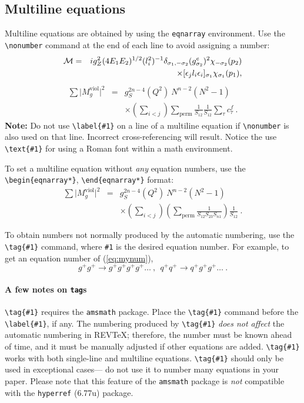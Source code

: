 \documentclass[%
 preprint, linenumbers,
 amsmath,amssymb,
 aps, physrev,
]{revtex4-2}
\begin{document}
\subsection{Multiline equations}

Multiline equations are obtained by using the \verb+eqnarray+
environment.  Use the \verb+\nonumber+ command at the end of each line
to avoid assigning a number:
\begin{eqnarray}
{\cal M}=&&ig_Z^2(4E_1E_2)^{1/2}(l_i^2)^{-1}
\delta_{\sigma_1,-\sigma_2}
(g_{\sigma_2}^e)^2\chi_{-\sigma_2}(p_2)\nonumber\\
&&\times
[\epsilon_jl_i\epsilon_i]_{\sigma_1}\chi_{\sigma_1}(p_1),
\end{eqnarray}
\begin{eqnarray}
\sum \vert M^{\text{viol}}_g \vert ^2&=&g^{2n-4}_S(Q^2)~N^{n-2}
        (N^2-1)\nonumber \\
 & &\times \left( \sum_{i<j}\right)
  \sum_{\text{perm}}
 \frac{1}{S_{12}}
 \frac{1}{S_{12}}
 \sum_\tau c^f_\tau~.
\end{eqnarray}
\textbf{Note:} Do not use \verb+\label{#1}+ on a line of a multiline
equation if \verb+\nonumber+ is also used on that line. Incorrect
cross-referencing will result. Notice the use \verb+\text{#1}+ for
using a Roman font within a math environment.

To set a multiline equation without \emph{any} equation
numbers, use the \verb+\begin{eqnarray*}+,
\verb+\end{eqnarray*}+ format:
\begin{eqnarray*}
\sum \vert M^{\text{viol}}_g \vert ^2&=&g^{2n-4}_S(Q^2)~N^{n-2}
        (N^2-1)\\
 & &\times \left( \sum_{i<j}\right)
 \left(
  \sum_{\text{perm}}\frac{1}{S_{12}S_{23}S_{n1}}
 \right)
 \frac{1}{S_{12}}~.
\end{eqnarray*}

To obtain numbers not normally produced by the automatic numbering,
use the \verb+\tag{#1}+ command, where \verb+#1+ is the desired
equation number. For example, to get an equation number of
(\ref{eq:mynum}),
\begin{equation}
g^+g^+ \rightarrow g^+g^+g^+g^+ \dots ~,~~q^+q^+\rightarrow
q^+g^+g^+ \dots ~. \tag{2.6$'$}\label{eq:mynum}
\end{equation}

\paragraph{A few notes on \texttt{tag}s} 
\verb+\tag{#1}+ requires the \texttt{amsmath} package. 
Place the \verb+\tag{#1}+ command before the \verb+\label{#1}+, if any. 
The numbering produced by \verb+\tag{#1}+ \textit{does not affect} 
the automatic numbering in REV\TeX; 
therefore, the number must be known ahead of time, 
and it must be manually adjusted if other equations are added. 
\verb+\tag{#1}+ works with both single-line and multiline equations. 
\verb+\tag{#1}+ should only be used in exceptional cases---%
do not use it to number many equations in your paper. 
Please note that this feature of the \texttt{amsmath} package
is \emph{not} compatible with the \texttt{hyperref} (6.77u) package.
\end{document}
